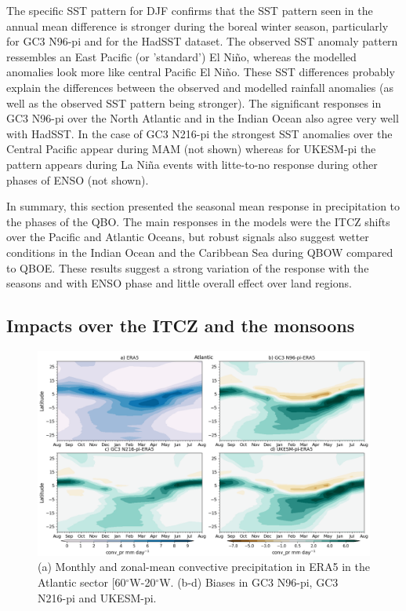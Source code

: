 The specific SST pattern for DJF confirms that the SST pattern seen in the annual mean difference is stronger during the boreal winter season, particularly for GC3 N96-pi and for the HadSST dataset. 
The observed SST anomaly pattern ressembles an East Pacific (or 'standard') El Niño, whereas the modelled anomalies look more like central Pacific El Niño. These SST differences probably explain the differences between the observed and modelled rainfall anomalies (as well as the observed SST pattern being stronger). The significant responses in GC3 N96-pi over the North Atlantic and in the Indian Ocean also agree very well with HadSST. 
In the case of GC3 N216-pi the strongest SST anomalies over the Central Pacific appear during MAM (not shown) whereas for UKESM-pi the pattern appears during La Niña events with litte-to-no response during other phases of ENSO (not shown).  

In summary, this section presented the seasonal mean response in precipitation to the phases of the QBO. The main responses in the models were the ITCZ shifts over the Pacific and Atlantic Oceans, but robust signals also suggest wetter conditions in the Indian Ocean and the Caribbean Sea during QBOW compared to QBOE. These results suggest a strong variation of the response with the seasons and with ENSO phase and little overall effect over land regions.

\subsection{Impacts over the ITCZ and the monsoons}

\begin{figure}[t!]
\centering
 \includegraphics[width=\linewidth]{figures/climcmip_bconv_pratl.png}
\caption[ITCZ seasonal cycle in the Atlantic Sector.]{(a) Monthly and zonal-mean convective precipitation in ERA5 in the Atlantic sector [60$^\circ$W-20$^\circ$W. (b-d) Biases in GC3 N96-pi, GC3 N216-pi and UKESM-pi. }
\label{fig:itczclimatl}
\end{figure}

